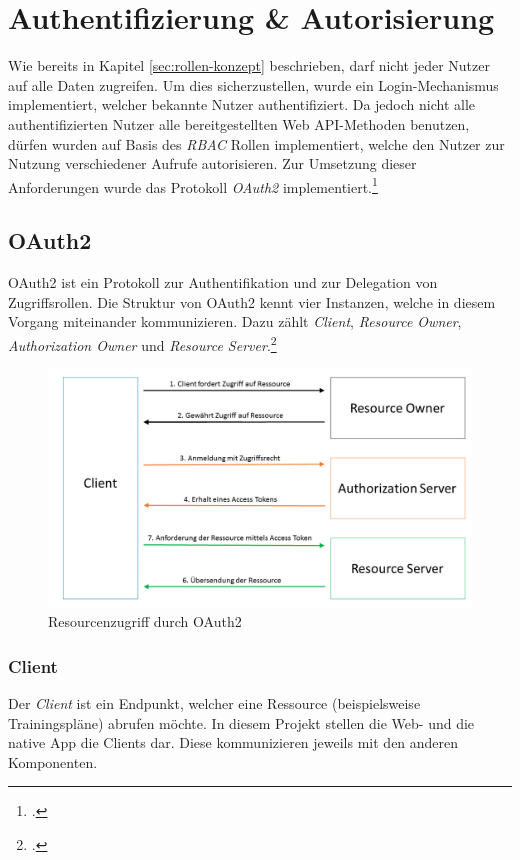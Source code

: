 \section{Authentifizierung \& Autorisierung}
\label{sec:server-authorisierung}
Wie bereits in Kapitel \ref{sec:rollen-konzept} beschrieben, darf nicht jeder Nutzer auf alle Daten zugreifen. Um dies sicherzustellen, wurde ein Login-Mechanismus implementiert, welcher bekannte Nutzer authentifiziert. Da jedoch nicht alle authentifizierten Nutzer alle bereitgestellten Web \ac{API}-Methoden benutzen, dürfen wurden auf Basis des \textit{\ac{RBAC}} Rollen implementiert, welche den Nutzer zur Nutzung verschiedener Aufrufe autorisieren. Zur Umsetzung dieser Anforderungen wurde das Protokoll \textit{OAuth2} implementiert.\footcite{online:WebApi_Authorize}
\subsection{OAuth2}
\label{ssec:oauth2}
OAuth2 ist ein Protokoll zur Authentifikation und zur Delegation von Zugriffsrollen. Die Struktur von OAuth2 kennt vier Instanzen, welche in diesem Vorgang miteinander kommunizieren. Dazu zählt \textit{Client}, \textit{Resource Owner}, \textit{Authorization Owner} und \textit{Resource Server}.\footcite[S. 286]{book:AngularJs:Steyer2015} 
\begin{figure}[h]
\centering
\includegraphics[width=1\linewidth]{content/images/OAuth2}
\caption{Resourcenzugriff durch OAuth2}
\label{pic:OAuth2}
\end{figure}
\subsubsection*{Client}
Der \textit{Client} ist ein Endpunkt, welcher eine Ressource (beispielsweise Trainingspläne) abrufen möchte. In diesem Projekt stellen die Web- und die native App die Clients dar. Diese kommunizieren jeweils mit den anderen Komponenten.
